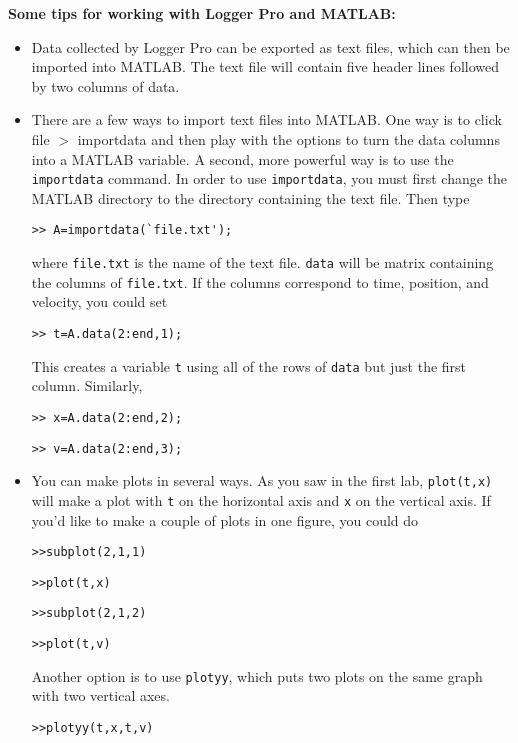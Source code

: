 \documentclass[11pt,letterpaper]{article}
\begin{document}
\textbf{Some tips for working with Logger Pro and MATLAB:}
\begin{itemize}
\item Data collected by Logger Pro can be exported as text files, which can then be imported into MATLAB. The text file will contain five header lines followed by two columns of data.

\item There are a few ways to import text files into MATLAB. One way is to click file $>$ importdata and then play with the options to turn the data columns into a MATLAB variable. A second, more powerful way is to use the \verb+importdata+ command. In order to use \verb+importdata+, you must first change the MATLAB directory to the directory containing the text file. Then type 
\begin{verbatim}>> A=importdata(`file.txt');\end{verbatim} 
where \verb+file.txt+ is the name of the text file. \verb+data+ will be matrix containing the columns of \verb+file.txt+. If the columns correspond to time, position, and velocity, you could set
\begin{verbatim}>> t=A.data(2:end,1);\end{verbatim}
This creates a variable \verb+t+ using all of the rows of \verb+data+ but just the first column. Similarly,
\begin{verbatim}>> x=A.data(2:end,2);\end{verbatim}
\begin{verbatim}>> v=A.data(2:end,3);\end{verbatim}

\item You can make plots in several ways. As you saw in the first lab, \verb+plot(t,x)+ will make a plot with \verb+t+ on the horizontal axis and \verb+x+ on the vertical axis. If you'd like to make a couple of plots in one figure, you could do
\begin{verbatim}>>subplot(2,1,1)\end{verbatim}
\begin{verbatim}>>plot(t,x)\end{verbatim}
\begin{verbatim}>>subplot(2,1,2)\end{verbatim}
\begin{verbatim}>>plot(t,v)\end{verbatim}
Another option is to use \verb+plotyy+, which puts two plots on the same graph with two vertical axes.
\begin{verbatim}>>plotyy(t,x,t,v)\end{verbatim}


\end{itemize}
\end{document}
